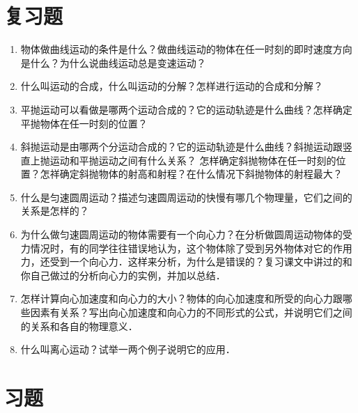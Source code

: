 \section*{复习题}

\begin{enumerate}
	\item 物体做曲线运动的条件是什么？做曲线运动的物体在任一时刻的即时速度方向是什么？为什么说曲线运动总是变速运动？
\item 什么叫运动的合成，什么叫运动的分解？怎样进行运动的合成和分解？
\item 平抛运动可以看做是哪两个运动合成的？它的运动轨迹是什么曲线？怎样确定平抛物体在任一时刻的位置？
\item 斜抛运动是由哪两个分运动合成的？它的运动轨迹是什么曲线？斜抛运动跟竖直上抛运动和平抛运动之间有什么关系？
怎样确定斜抛物体在任一时刻的位置？怎祥确定斜抛物体的射高和射程？在什么情况下斜抛物体的射程最大？
\item 什么是匀速圆周运动？描述匀速圆周运动的快慢有哪几个物理量，它们之间的关系是怎样的？
\item 为什么做匀速圆周运动的物体需要有一个向心力？在分析做圆周运动物体的受力情况时，有的同学往往错误地认为，这个物体除了受到另外物体对它的作用力，还受到一个向心力．这样来分析，为什么是错误的？复习课文中讲过的和你自己做过的分析向心力的实例，并加以总结．
\item 怎样计算向心加速度和向心力的大小？物体的向心加速度和所受的向心力跟哪些因素有关系？写出向心加速度和向心力的不同形式的公式，并说明它们之间的关系和各自的物理意义．
\item  什么叫离心运动？试举一两个例子说明它的应用．
\end{enumerate}


\section*{习题}


